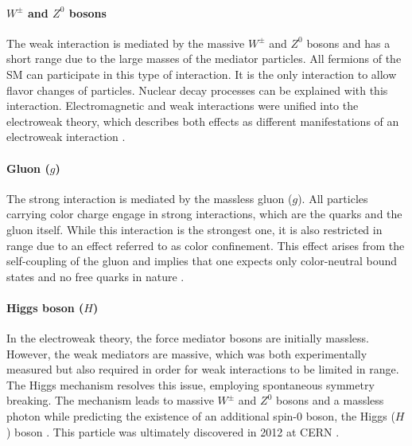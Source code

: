 \paragraph{$W^\pm$ and $Z^0$ bosons}
The weak interaction is mediated by the massive $W^\pm$ and $Z^0$ bosons and has a short range due to the large masses of the mediator particles. All fermions of the \ac{SM} can participate in this type of interaction. It is the only interaction to allow flavor changes of particles. Nuclear decay processes can be explained with this interaction. Electromagnetic and weak interactions were unified into the electroweak theory, which describes both effects as different manifestations of an electroweak interaction \cite{Book-Griffiths}. 
\paragraph{Gluon ($g$)}
The strong interaction is mediated by the massless gluon ($g$). All particles carrying color charge engage in strong interactions, which are the quarks and the gluon itself. While this interaction is the strongest one, it is also restricted in range due to an effect referred to as color confinement. This effect arises from the self-coupling of the gluon and implies that one expects only color-neutral bound states and no free quarks in nature \cite{Book-Thomson,SM-Gaillard}.
\paragraph{Higgs boson ($H$)}
In the electroweak theory, the force mediator bosons are initially massless. However, the weak mediators are massive, which was both experimentally measured but also required in order for weak interactions to be limited in range. The Higgs mechanism \cite{SymmetryBreaking-Higgs,SymmetryBreaking-Englert} resolves this issue, employing spontaneous symmetry breaking. The mechanism leads to massive $W^\pm$ and $Z^0$ bosons and a massless photon while predicting the existence of an additional spin-$0$ boson, the Higgs ($H$) boson \cite{Book-Thomson}. This particle was ultimately discovered in 2012 at \acs{CERN} \cite{HiggsDiscovery-CMS,HiggsDiscovery-ATLAS}.


